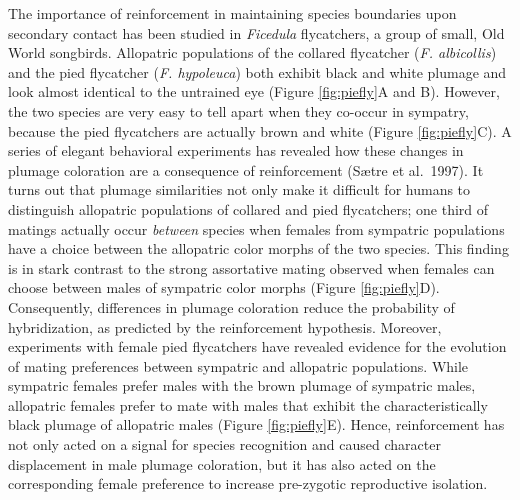 \documentclass[
]{book}
\begin{document}
The importance of reinforcement in maintaining species boundaries upon secondary contact has been studied in \emph{Ficedula} flycatchers, a group of small, Old World songbirds. Allopatric populations of the collared flycatcher (\emph{F. albicollis}) and the pied flycatcher (\emph{F. hypoleuca}) both exhibit black and white plumage and look almost identical to the untrained eye (Figure \ref{fig:piefly}A and B). However, the two species are very easy to tell apart when they co-occur in sympatry, because the pied flycatchers are actually brown and white (Figure \ref{fig:piefly}C). A series of elegant behavioral experiments has revealed how these changes in plumage coloration are a consequence of reinforcement (Sætre et al.~1997). It turns out that plumage similarities not only make it difficult for humans to distinguish allopatric populations of collared and pied flycatchers; one third of matings actually occur \emph{between} species when females from sympatric populations have a choice between the allopatric color morphs of the two species. This finding is in stark contrast to the strong assortative mating observed when females can choose between males of sympatric color morphs (Figure \ref{fig:piefly}D). Consequently, differences in plumage coloration reduce the probability of hybridization, as predicted by the reinforcement hypothesis. Moreover, experiments with female pied flycatchers have revealed evidence for the evolution of mating preferences between sympatric and allopatric populations. While sympatric females prefer males with the brown plumage of sympatric males, allopatric females prefer to mate with males that exhibit the characteristically black plumage of allopatric males (Figure \ref{fig:piefly}E). Hence, reinforcement has not only acted on a signal for species recognition and caused character displacement in male plumage coloration, but it has also acted on the corresponding female preference to increase pre-zygotic reproductive isolation.
\end{document}

